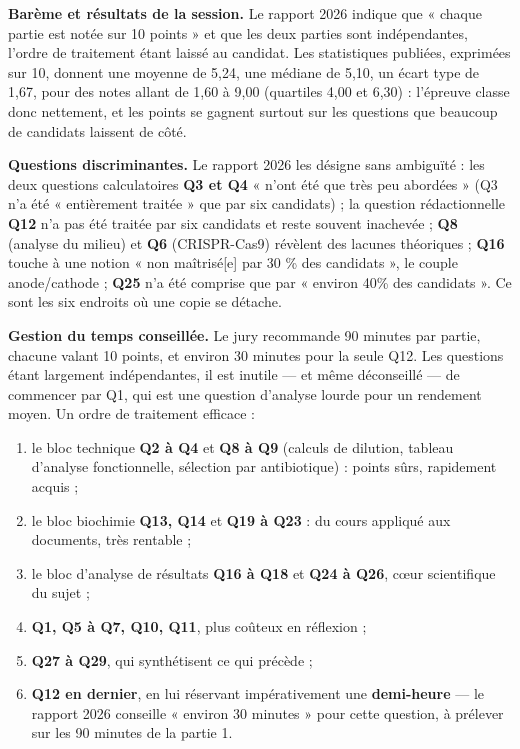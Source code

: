 \documentclass[11pt,a4paper]{article}
\providecommand{\tightlist}{\setlength{\itemsep}{0pt}\setlength{\parskip}{0pt}}
\begin{document}
\textbf{Barème et résultats de la session.} Le rapport 2026 indique que « chaque partie est notée sur 10 points » et que les deux parties sont indépendantes, l'ordre de traitement étant laissé au candidat. Les statistiques publiées, exprimées sur 10, donnent une moyenne de 5,24, une médiane de 5,10, un écart type de 1,67, pour des notes allant de 1,60 à 9,00 (quartiles 4,00 et 6,30) : l'épreuve classe donc nettement, et les points se gagnent surtout sur les questions que beaucoup de candidats laissent de côté.

\textbf{Questions discriminantes.} Le rapport 2026 les désigne sans ambiguïté : les deux questions calculatoires \textbf{Q3 et Q4} « n'ont été que très peu abordées » (Q3 n'a été « entièrement traitée » que par six candidats) ; la question rédactionnelle \textbf{Q12} n'a pas été traitée par six candidats et reste souvent inachevée ; \textbf{Q8} (analyse du milieu) et \textbf{Q6} (CRISPR-Cas9) révèlent des lacunes théoriques ; \textbf{Q16} touche à une notion « non maîtrisé{[}e{]} par 30 \% des candidats », le couple anode/cathode ; \textbf{Q25} n'a été comprise que par « environ 40\% des candidats ». Ce sont les six endroits où une copie se détache.

\textbf{Gestion du temps conseillée.} Le jury recommande 90 minutes par partie, chacune valant 10 points, et environ 30 minutes pour la seule Q12. Les questions étant largement indépendantes, il est inutile --- et même déconseillé --- de commencer par Q1, qui est une question d'analyse lourde pour un rendement moyen. Un ordre de traitement efficace :

\begin{enumerate}
\def\labelenumi{\arabic{enumi}.}
\tightlist
\item
  le bloc technique \textbf{Q2 à Q4} et \textbf{Q8 à Q9} (calculs de dilution, tableau d'analyse fonctionnelle, sélection par antibiotique) : points sûrs, rapidement acquis ;
\item
  le bloc biochimie \textbf{Q13, Q14} et \textbf{Q19 à Q23} : du cours appliqué aux documents, très rentable ;
\item
  le bloc d'analyse de résultats \textbf{Q16 à Q18} et \textbf{Q24 à Q26}, cœur scientifique du sujet ;
\item
  \textbf{Q1, Q5 à Q7, Q10, Q11}, plus coûteux en réflexion ;
\item
  \textbf{Q27 à Q29}, qui synthétisent ce qui précède ;
\item
  \textbf{Q12 en dernier}, en lui réservant impérativement une \textbf{demi-heure} --- le rapport 2026 conseille « environ 30 minutes » pour cette question, à prélever sur les 90 minutes de la partie 1.
\end{enumerate}
\end{document}
